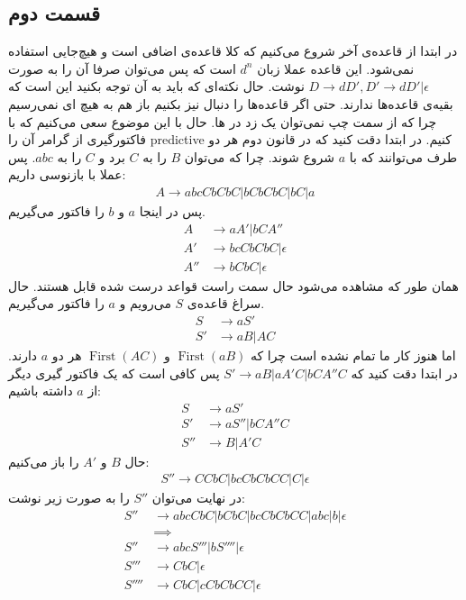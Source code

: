\documentclass[]{article}
\begin{document}
\subsection*{قسمت دوم}
در ابتدا از قاعده‌ی آخر شروع می‌کنیم که کلا قاعده‌ی اضافی است و هیچ‌جایی استفاده نمی‌شود.
این قاعده عملا زبان
$d^n$
است که پس می‌توان صرفا آن را به صورت
$D \rightarrow dD', D' \rightarrow dD' | \epsilon$
نوشت. حال نکته‌ای که باید به آن توجه بکنید این است که بقیه‌ی قاعده‌ها
ندارند. حتی اگر قاعده‌ها را دنبال نیز بکنیم باز هم به هیچ
ای
نمی‌رسیم چرا که از سمت چپ نمی‌توان یک
زد در
ها.
حال با این موضوع سعی می‌کنیم که با فاکتورگیری از گرامر آن را
predictive
کنیم. در ابتدا دقت کنید که در قانون دوم هر دو طرف می‌توانند که با
$a$
شروع شوند. چرا که می‌توان
$B$ را به $C$ برد و $C$ را به $abc$.
پس عملا با بازنوسی داریم:
\begin{gather*}
    A \rightarrow abcCbCbC | bCbCbC | bC | a
\end{gather*}
پس در اینجا
$a$ و $b$
را فاکتور می‌گیریم.
\begin{align*}
    A  &\rightarrow aA' | bCA''\\
    A' &\rightarrow bcCbCbC | \epsilon\\
    A'' &\rightarrow bCbC | \epsilon
\end{align*}
همان طور که مشاهده می‌شود حال سمت راست قواعد درست شده قابل
هستند. حال سراغ قاعده‌ی
$S$
می‌رویم و
$a$
را فاکتور می‌گیریم.
\begin{align*}
    S &\rightarrow aS'\\
    S' &\rightarrow aB | AC
\end{align*}
اما هنوز کار ما تمام نشده است چرا که
$\operatorname{First}(aB)$ و $\operatorname{First}(AC)$
هر دو
$a$
دارند. در ابتدا دقت کنید که
$S' \rightarrow aB | aA'C | bCA''C$
پس کافی است که یک فاکتور گیری دیگر از
$a$
داشته باشیم:
\begin{align*}
    S &\rightarrow aS'\\
    S' &\rightarrow aS'' | bCA''C\\
    S'' &\rightarrow B | A'C
\end{align*}
حال
$B$ و $A'$
را باز می‌کنیم:
\begin{gather*}
    S'' \rightarrow CCbC | bcCbCbCC | C | \epsilon
\end{gather*}
در نهایت می‌توان
$S''$
را به صورت زیر نوشت:
\begin{align*}
    S'' &\rightarrow abcCbC | bCbC | bcCbCbCC | abc | b | \epsilon\\
    &\implies\\
    S'' &\rightarrow abcS''' | bS'''' | \epsilon\\
    S''' &\rightarrow CbC | \epsilon\\
    S'''' &\rightarrow CbC | cCbCbCC | \epsilon
\end{align*}
\end{document}
